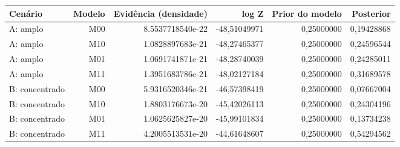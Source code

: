 \begin{tabular}{lrrrrr}
\toprule
Cenário & Modelo & Evidência (densidade) & log Z & Prior do modelo & Posterior \\
\midrule
A: amplo & M00 & 8.5537718540e-22 & -48,51049971 & 0,25000000 & 0,19428868 \\
A: amplo & M10 & 1.0828897683e-21 & -48,27465377 & 0,25000000 & 0,24596544 \\
A: amplo & M01 & 1.0691741871e-21 & -48,28740039 & 0,25000000 & 0,24285011 \\
A: amplo & M11 & 1.3951683786e-21 & -48,02127184 & 0,25000000 & 0,31689578 \\
B: concentrado & M00 & 5.9316520346e-21 & -46,57398419 & 0,25000000 & 0,07667004 \\
B: concentrado & M10 & 1.8803176673e-20 & -45,42026113 & 0,25000000 & 0,24304196 \\
B: concentrado & M01 & 1.0625625827e-20 & -45,99101834 & 0,25000000 & 0,13734238 \\
B: concentrado & M11 & 4.2005513531e-20 & -44,61648607 & 0,25000000 & 0,54294562 \\
\bottomrule
\end{tabular}
